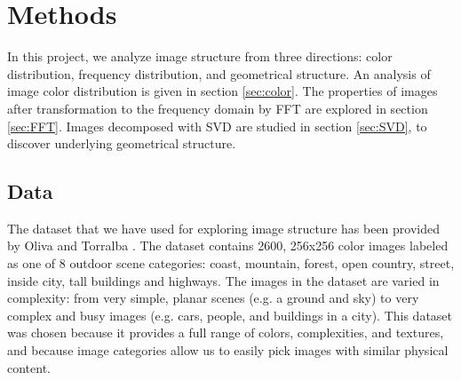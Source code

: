 \documentclass{report}
\begin{document}
\chapter{Methods}
In this project, we analyze image structure from three directions: color distribution, frequency distribution, and geometrical structure. An analysis of image color distribution is given in section \ref{sec:color}. The properties of images after transformation to the frequency domain by FFT are explored in section \ref{sec:FFT}. Images decomposed with SVD are studied in section \ref{sec:SVD}, to discover underlying geometrical structure.
 

\section{Data}
The dataset that we have used for exploring image structure has been provided by Oliva and Torralba \cite{gist_descriptor}. The dataset contains 2600, 256x256 color images labeled as one of 8 outdoor scene categories: coast, mountain, forest, open country, street, inside city, tall buildings and highways. The images in the dataset are varied in complexity: from very simple, planar scenes (e.g. a ground and sky) to very complex and busy images (e.g. cars, people, and buildings in a city). This dataset was chosen because it provides a full range of colors, complexities, and textures, and because image categories allow us to easily pick images with similar physical content.
\end{document}
